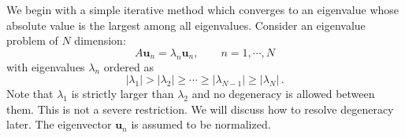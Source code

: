 We begin with a simple iterative method which converges to an eigenvalue whose absolute value is the largest among all eigenvalues. Consider an eigenvalue problem of $N$ dimension:
\begin{equation}
A \mathbf{u}_n = \lambda_n \mathbf{u}_n,\qquad n=1,\cdots, N
\end{equation}
with eigenvalues $\lambda_n$ ordered as
\begin{equation}\label{eq:lambda_order}
|\lambda_1| > |\lambda_2| \geq \cdots \geq |\lambda_{N-1}| \geq |\lambda_N|\,.
\end{equation}
Note that $\lambda_1$ is strictly larger than $\lambda_2$ and no degeneracy is allowed between them.  This is not a severe restriction. We will discuss how to resolve degeneracy later.  The eigenvector $\mathbf{u}_n$ is assumed to be normalized.

